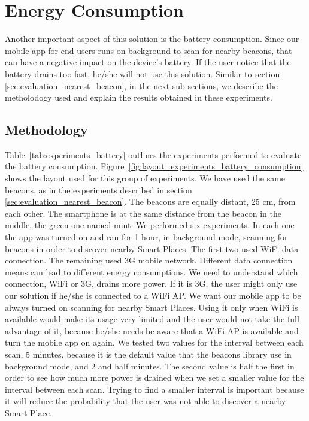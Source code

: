 \section{Energy Consumption}
\label{sec:evaluation_energy_consumption}
Another important aspect of this solution is the battery consumption.
Since our mobile app for end users runs on background to scan for nearby beacons, that can have a negative impact on the device's battery. If the user notice that the battery drains too fast, he/she will not use this solution.
Similar to section \ref{sec:evaluation_nearest_beacon}, in the next sub sections, we describe the metholodogy used and explain the results obtained in these experiments.

\subsection{Methodology}
\label{sub:evaluation_energy_consumption_methodology}
Table~\ref{tab:experiments_battery} outlines the experiments performed to evaluate the battery consumption.
Figure~\ref{fig:layout_experiments_battery_consumption} shows the layout used for this group of experiments.
We have used the same beacons, as in the experiments described in section \ref{sec:evaluation_nearest_beacon}.
The beacons are equally distant, 25 cm, from each other.
The smartphone is at the same distance from the beacon in the middle, the green one named mint.
We performed six experiments.
In each one the app was turned on and ran for 1 hour, in background mode, scanning for beacons in order to discover nearby Smart Places.
The first two used \gls{WiFi} data connection.
The remaining used \gls{3G} mobile network.
Different data connection means can lead to different energy consumptions.
We need to understand which connection, \gls{WiFi} or \gls{3G}, drains more power.
If it is \gls{3G}, the user might only use our solution if he/she is connected to a \gls{WiFi} \gls{AP}.
We want our mobile app to be always turned on scanning for nearby Smart Places.
Using it only when \gls{WiFi} is available would make its usage very limited and the user would not take the full advantage of it, because he/she needs be aware that a \gls{WiFi} \gls{AP} is available and turn the mobile app on again.
We tested two values for the interval between each scan, 5 minutes, because it is the default value that the beacons library use in background mode, and 2 and half minutes.
The second value is half the first in order to see how much more power is drained when we set a smaller value for the interval between each scan.
Trying to find a smaller interval is important because it will reduce the probability that the user was not able to discover a nearby Smart Place.

